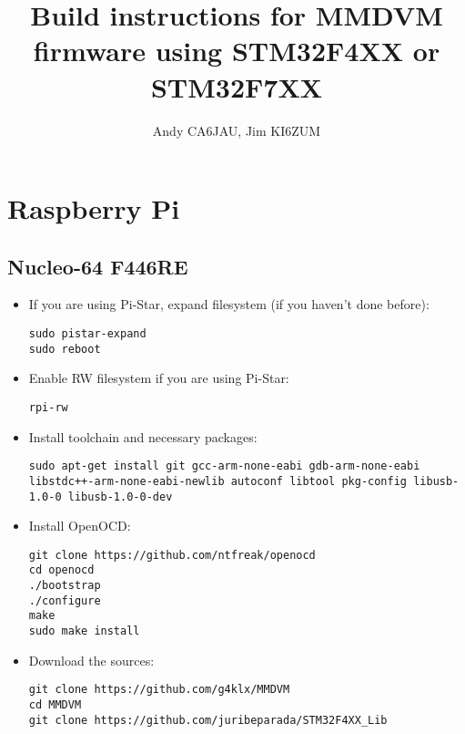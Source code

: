 \documentclass[]{article}
\title{Build instructions for MMDVM firmware using STM32F4XX or STM32F7XX}
\author{Andy CA6JAU, Jim KI6ZUM}
\begin{document}
\maketitle
\tableofcontents

\section{Raspberry Pi}

\subsection{Nucleo-64 F446RE}

\begin{itemize}[leftmargin=*]
	
\item If you are using Pi-Star, expand filesystem (if you haven't done before):

\begin{lstlisting}[style=DOS]
sudo pistar-expand
sudo reboot
\end{lstlisting}

\item Enable RW filesystem if you are using Pi-Star:
\begin{lstlisting}[style=DOS]
rpi-rw
\end{lstlisting}

\item Install toolchain and necessary packages:

\begin{lstlisting}[style=DOS]
sudo apt-get install git gcc-arm-none-eabi gdb-arm-none-eabi libstdc++-arm-none-eabi-newlib autoconf libtool pkg-config libusb-1.0-0 libusb-1.0-0-dev
\end{lstlisting}

\item Install OpenOCD:

\begin{lstlisting}[style=DOS]
git clone https://github.com/ntfreak/openocd
cd openocd
./bootstrap
./configure
make
sudo make install
\end{lstlisting}

\item Download the sources:

\begin{lstlisting}[style=DOS]
git clone https://github.com/g4klx/MMDVM
cd MMDVM
git clone https://github.com/juribeparada/STM32F4XX_Lib
\end{lstlisting}


\end{itemize}
\end{document}
